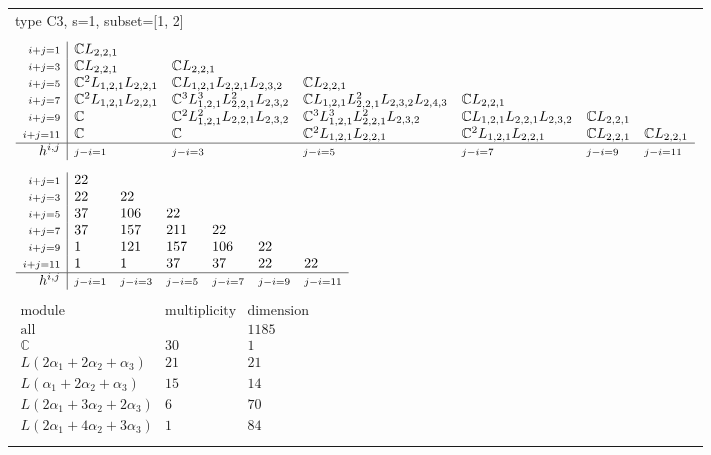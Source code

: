 \documentclass[crop,border=2mm]{standalone}
\begin{document}
\begin{tabular}{l}
{\huge type C3, s=1, subset=[1, 2]}\\ \\


$\displaystyle
\begin{array}{r|l l l l l l}
	{\scriptstyle i+j=1}&\mathbb{C}L_{2,2,1}&&&&&\\
	{\scriptstyle i+j=3}&\mathbb{C}L_{2,2,1}&\mathbb{C}L_{2,2,1}&&&&\\
	{\scriptstyle i+j=5}&\mathbb{C}^{2}L_{1,2,1}L_{2,2,1}&\mathbb{C}L_{1,2,1}L_{2,2,1}L_{2,3,2}&\mathbb{C}L_{2,2,1}&&&\\
	{\scriptstyle i+j=7}&\mathbb{C}^{2}L_{1,2,1}L_{2,2,1}&\mathbb{C}^{3}L_{1,2,1}^{3}L_{2,2,1}^{2}L_{2,3,2}&\mathbb{C}L_{1,2,1}L_{2,2,1}^{2}L_{2,3,2}L_{2,4,3}&\mathbb{C}L_{2,2,1}&&\\
	{\scriptstyle i+j=9}&\mathbb{C}&\mathbb{C}^{2}L_{1,2,1}^{2}L_{2,2,1}L_{2,3,2}&\mathbb{C}^{3}L_{1,2,1}^{3}L_{2,2,1}^{2}L_{2,3,2}&\mathbb{C}L_{1,2,1}L_{2,2,1}L_{2,3,2}&\mathbb{C}L_{2,2,1}&\\
	{\scriptstyle i+j=11}&\mathbb{C}&\mathbb{C}&\mathbb{C}^{2}L_{1,2,1}L_{2,2,1}&\mathbb{C}^{2}L_{1,2,1}L_{2,2,1}&\mathbb{C}L_{2,2,1}&\mathbb{C}L_{2,2,1}\\
	\hline h^{i,j}&{\scriptstyle j-i=1}&{\scriptstyle j-i=3}&{\scriptstyle j-i=5}&{\scriptstyle j-i=7}&{\scriptstyle j-i=9}&{\scriptstyle j-i=11}
\end{array}
$ \\ \\


$\displaystyle
\begin{array}{r|l l l l l l}
	{\scriptstyle i+j=1}&22&&&&&\\
	{\scriptstyle i+j=3}&22&22&&&&\\
	{\scriptstyle i+j=5}&37&106&22&&&\\
	{\scriptstyle i+j=7}&37&157&211&22&&\\
	{\scriptstyle i+j=9}&1&121&157&106&22&\\
	{\scriptstyle i+j=11}&1&1&37&37&22&22\\
	\hline h^{i,j}&{\scriptstyle j-i=1}&{\scriptstyle j-i=3}&{\scriptstyle j-i=5}&{\scriptstyle j-i=7}&{\scriptstyle j-i=9}&{\scriptstyle j-i=11}
\end{array}
$ \\ \\


$\displaystyle
\begin{array}{rll}
	\text{module}&\text{multiplicity}&\text{dimension} \\ \hline \text{all}&&1185 \\
	\mathbb{C}&30&1\\
	L\left( 2\alpha_{1}+ 2\alpha_{2}+\alpha_{3}\right)&21&21\\
	L\left(\alpha_{1}+ 2\alpha_{2}+\alpha_{3}\right)&15&14\\
	L\left( 2\alpha_{1}+ 3\alpha_{2}+ 2\alpha_{3}\right)&6&70\\
	L\left( 2\alpha_{1}+ 4\alpha_{2}+ 3\alpha_{3}\right)&1&84
\end{array}
$ \\ \\

\end{tabular}
\end{document}
